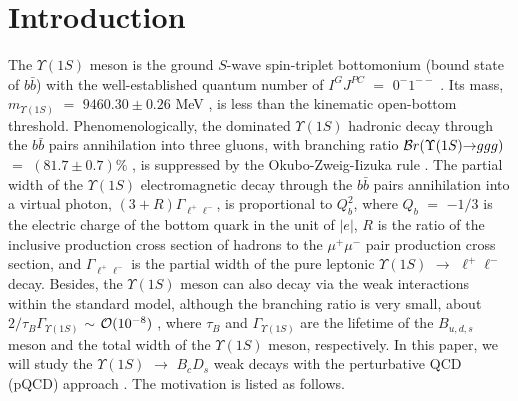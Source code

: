 \documentclass[preprint,superscriptaddress,nofootinbib]{revtex4}
\begin{document}
  \section{Introduction}
  \label{sec01}
  The ${\Upsilon}(1S)$ meson is the ground $S$-wave spin-triplet bottomonium
  (bound state of $b\bar{b}$) with the well-established quantum
  number of $I^{G}J^{PC}$ $=$ $0^{-}1^{--}$ \cite{pdg}.
  Its mass, $m_{{\Upsilon}(1S)}$ $=$ $9460.30{\pm}0.26$ MeV
  \cite{pdg}, is less than the kinematic open-bottom threshold.
  Phenomenologically, the dominated ${\Upsilon}(1S)$ hadronic
  decay through the $b\bar{b}$ pairs annihilation into three gluons,
  with branching ratio ${\cal B}r({\Upsilon}(1S){\to}ggg)$
  $=$ $(81.7{\pm}0.7)\%$ \cite{pdg}, is suppressed by the
  Okubo-Zweig-Iizuka rule \cite{o,z,i}.
  The partial width of the ${\Upsilon}(1S)$ electromagnetic
  decay through the $b\bar{b}$ pairs annihilation into a
  virtual photon, $(3+R){\Gamma}_{{\ell}^{+}{\ell}^{-}}$,
  is proportional to $Q_{b}^{2}$,
  where $Q_{b}$ $=$ $-1/3$ is the electric charge of
  the bottom quark in the unit of ${\vert}e{\vert}$,
  $R$ is the ratio of the inclusive production cross section
  of hadrons to the ${\mu}^{+}{\mu}^{-}$ pair production cross
  section, and ${\Gamma}_{{\ell}^{+}{\ell}^{-}}$ is the partial
  width of the pure leptonic ${\Upsilon}(1S)$ ${\to}$
  ${\ell}^{+}{\ell}^{-}$ decay.
  Besides\footnotemark[1],
  the ${\Upsilon}(1S)$ meson can also decay
  via the weak interactions within the standard model,
  although the branching ratio is very small,
  about $2/{\tau}_{B}{\Gamma}_{{\Upsilon}(1S)}$
  ${\sim}$ ${\cal O}(10^{-8})$ \cite{pdg},
  where ${\tau}_{B}$ and ${\Gamma}_{{\Upsilon}(1S)}$
  are the lifetime of the $B_{u,d,s}$ meson and the
  total width of the ${\Upsilon}(1S)$ meson, respectively.
  In this paper, we will study the ${\Upsilon}(1S)$ ${\to}$
  $B_{c}D_{s}$ weak decays with the perturbative QCD (pQCD)
  approach \cite{pqcd1,pqcd2,pqcd3}.
  The motivation is listed as follows.
\end{document}
